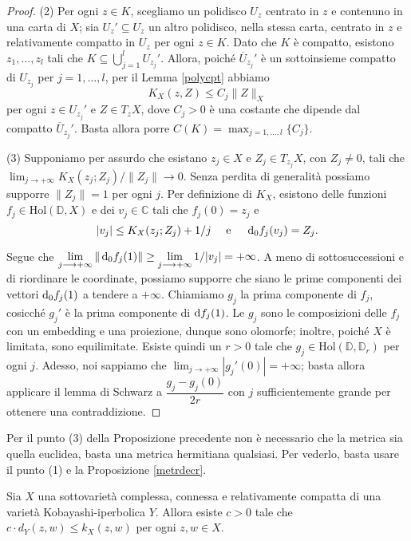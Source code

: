 \begin{proof}
    (2) Per ogni $z \in K$, scegliamo un polidisco $U_z$ centrato in $z$ e contenuno in una carta di $X$; sia $U_z'\subseteq U_z$ un altro polidisco, nella stessa carta, centrato in $z$ e relativamente compatto in $U_z$ per ogni $z \in K$. Dato che $K$ è compatto, esistono $z_1,\dots,z_l$ tali che $K\subseteq\displaystyle\bigcup_{j=1}^l U_{z_j}'$. Allora, poiché $\overline{U}_{z_j}'$ è un sottoinsieme compatto di $U_{z_j}$ per $j=1,\dots,l$, per il Lemma \ref{polycpt} abbiamo
    $$K_X(z,Z) \le C_j\|Z\|_X$$
    per ogni $z \in U_{z_j}'$ e $Z\in T_zX$, dove $C_j>0$ è una costante che dipende dal compatto $\overline{U}_{z_j}'$. Basta allora porre $C(K)=\displaystyle\max_{j=1,\dots,l}\{C_j\}$.

    (3) Supponiamo per assurdo che esistano $z_j \in X$ e $Z_j \in T_{z_j}X$, con $Z_j\not=0$, tali che $\displaystyle \lim_{j \longrightarrow +\infty} K_X(z_j;Z_j)/\|Z_j\| \longrightarrow 0$. Senza perdita di generalità possiamo supporre $\|Z_j\|=1$ per ogni $j$. Per definizione di $K_X$, esistono delle funzioni $f_j\in\text{Hol}(\mathbb{D},X)$ e dei $v_j \in \mathbb{C}$ tali che $f_j(0)=z_j$ e
    $$|v_j| \le K_X(z_j;Z_j)+1/j\quad\text{ e }\quad \mathop{}\!\mathrm{d}_0 f_j(v_j)=Z_j.$$

    Segue che $\displaystyle \lim_{j \longrightarrow +\infty}\|\mathop{}\!\mathrm{d}_0f_j(1)\| \ge \lim_{j \longrightarrow +\infty}1/|v_j|=+\infty$. A meno di sottosuccessioni e di riordinare le coordinate, possiamo supporre che siano le prime componenti dei vettori $\mathop{}\!\mathrm{d}_0f_j(1)$ a tendere a $+\infty$. Chiamiamo $g_j$ la prima componente di $f_j$, cosicché $g_j'$ è la prima componente di $\mathop{}\!\mathrm{d} f_j(1)$. Le $g_j$ sono le composizioni delle $f_j$ con un embedding e una proiezione, dunque sono olomorfe; inoltre, poiché $X$ è limitata, sono equilimitate. Esiste quindi un $r>0$ tale che $g_j \in \text{Hol}(\mathbb{D},\mathbb{D}_r)$ per ogni $j$. Adesso, noi sappiamo che $\displaystyle\lim_{j\longrightarrow +\infty} |g_j'(0)|=+\infty$; basta allora applicare il lemma di Schwarz a $\dfrac{g_j-g_j(0)}{2r}$ con $j$ sufficientemente grande per ottenere una contraddizione.
\end{proof}

\begin{oss} \label{basta_herm}
    Per il punto (3) della Proposizione precedente non è necessario che la metrica sia quella euclidea, basta una metrica hermitiana qualsiasi. Per vederlo, basta usare il punto (1) e la Proposizione \ref{metrdecr}.
\end{oss}

\begin{cor} \label{dist_da_sotto}
    Sia $X$ una sottovarietà complessa, connessa e relativamente compatta di una varietà Kobayashi-iperbolica $Y$. Allora esiste $c>0$ tale che $c\cdot d_Y(z,w) \le k_X(z,w)$ per ogni $z,w \in X$.
\end{cor}

